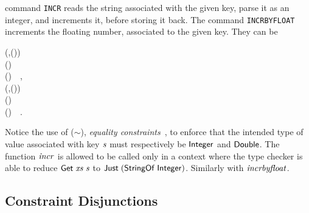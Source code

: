 \Redis{} command \texttt{INCR} reads the string associated with the given key,
parse it as an integer, and increments it, before storing it back. The command
\texttt{INCRBYFLOAT} increments the floating number, associated to the given
key. They can be
\begin{hscode}\SaveRestoreHook
{}%
%
%
%
\>[B]{}\<[7]%
\>[7]{}\mathbin{::}(\;,\;\;\mathord{\sim}\;(\;)){}\<[E]%
\\
\>[7]{}\Rightarrow {}\;\to {}\;\;\;(\;\;){}\<[E]%
\\
\>[B]{}\;\mathrel{=}\mathbin{\$}\;(\;)~~,{}\<[E]%
\\[\blanklineskip]%
\>[B]{}\<[14]%
\>[14]{}\mathbin{::}(\;,\;\;\mathord{\sim}\;(\;)){}\<[E]%
\\
\>[14]{}\Rightarrow {}\;\to {}\to {}\;\;\;(\;\;){}\<[E]%
\\
\>[B]{}\;\;\mathrel{=}\mathbin{\$}\;(\;)\;~~.{}\<[E]%
\ColumnHook
\end{hscode}\resethooks
Notice the use of (\ensuremath{\mathord{\sim}}), \emph{equality constraints}~\cite{typeeq}, to enforce
that the intended type of value associated with key \ensuremath{\Varid{s}} must respectively be
\ensuremath{\Conid{Integer}} and \ensuremath{\Conid{Double}}. The function \ensuremath{\Varid{incr}} is allowed to be called only
in a context where the type checker is able to reduce \ensuremath{\Conid{Get}\;\Varid{xs}\;\Varid{s}} to
\ensuremath{\Conid{Just}\;(\Conid{StringOf}\;\Conid{Integer})}. Similarly with \ensuremath{\Varid{incrbyfloat}}.


\subsection{Constraint Disjunctions}

